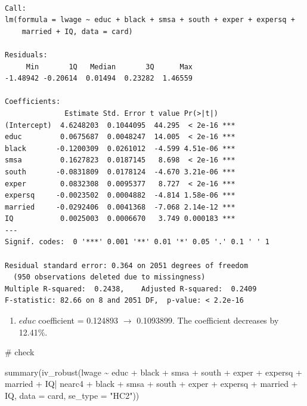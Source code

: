 \documentclass[
  letterpaper,
  DIV=11,
  numbers=noendperiod]{scrartcl}
\newenvironment{Shaded}{\begin{snugshade}}{\end{snugshade}}
\newcommand{\AttributeTok}[1]{\textcolor[rgb]{0.40,0.45,0.13}{#1}}
\newcommand{\CommentTok}[1]{\textcolor[rgb]{0.37,0.37,0.37}{#1}}
\newcommand{\FunctionTok}[1]{\textcolor[rgb]{0.28,0.35,0.67}{#1}}
\newcommand{\NormalTok}[1]{\textcolor[rgb]{0.00,0.23,0.31}{#1}}
\newcommand{\SpecialCharTok}[1]{\textcolor[rgb]{0.37,0.37,0.37}{#1}}
\newcommand{\StringTok}[1]{\textcolor[rgb]{0.13,0.47,0.30}{#1}}
\providecommand{\tightlist}{%
  \setlength{\itemsep}{0pt}\setlength{\parskip}{0pt}}\usepackage{longtable,booktabs,array}
\begin{document}
\begin{verbatim}

Call:
lm(formula = lwage ~ educ + black + smsa + south + exper + expersq + 
    married + IQ, data = card)

Residuals:
     Min       1Q   Median       3Q      Max 
-1.48942 -0.20614  0.01494  0.23282  1.46559 

Coefficients:
              Estimate Std. Error t value Pr(>|t|)    
(Intercept)  4.6248203  0.1044095  44.295  < 2e-16 ***
educ         0.0675687  0.0048247  14.005  < 2e-16 ***
black       -0.1200309  0.0261012  -4.599 4.51e-06 ***
smsa         0.1627823  0.0187145   8.698  < 2e-16 ***
south       -0.0831809  0.0178124  -4.670 3.21e-06 ***
exper        0.0832308  0.0095377   8.727  < 2e-16 ***
expersq     -0.0023502  0.0004882  -4.814 1.58e-06 ***
married     -0.0292406  0.0041368  -7.068 2.14e-12 ***
IQ           0.0025003  0.0006670   3.749 0.000183 ***
---
Signif. codes:  0 '***' 0.001 '**' 0.01 '*' 0.05 '.' 0.1 ' ' 1

Residual standard error: 0.364 on 2051 degrees of freedom
  (950 observations deleted due to missingness)
Multiple R-squared:  0.2438,    Adjusted R-squared:  0.2409 
F-statistic: 82.66 on 8 and 2051 DF,  p-value: < 2.2e-16
\end{verbatim}

\begin{enumerate}
\def\labelenumi{\alph{enumi}.}
\setcounter{enumi}{1}
\tightlist
\item
  \(educ\) coefficient = 0.124893 \(\rightarrow\) 0.1093899. The
  coefficient decreases by 12.41\%.
\end{enumerate}

\begin{Shaded}
\begin{Highlighting}[]
\CommentTok{\# check}

\FunctionTok{summary}\NormalTok{(}\FunctionTok{iv\_robust}\NormalTok{(lwage }\SpecialCharTok{\textasciitilde{}}\NormalTok{ educ }\SpecialCharTok{+}\NormalTok{ black }\SpecialCharTok{+}\NormalTok{ smsa }\SpecialCharTok{+}\NormalTok{ south }\SpecialCharTok{+}\NormalTok{ exper }\SpecialCharTok{+}\NormalTok{ expersq }
                  \SpecialCharTok{+}\NormalTok{ married }\SpecialCharTok{+}\NormalTok{ IQ}\SpecialCharTok{|}\NormalTok{ nearc4 }\SpecialCharTok{+}\NormalTok{ black }\SpecialCharTok{+}\NormalTok{ smsa }\SpecialCharTok{+}\NormalTok{ south }\SpecialCharTok{+}\NormalTok{ exper }\SpecialCharTok{+} 
\NormalTok{                    expersq }\SpecialCharTok{+}\NormalTok{ married }\SpecialCharTok{+}\NormalTok{ IQ,}
                \AttributeTok{data =}\NormalTok{ card, }\AttributeTok{se\_type =} \StringTok{"HC2"}\NormalTok{))}
\end{Highlighting}
\end{Shaded}
\end{document}
